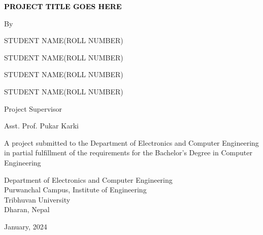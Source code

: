 \begin{titlepage}
    \centering
    
    {\fontsize{12pt}{14pt}\bfseries\textcolor{black}{PROJECT TITLE GOES HERE}\par}
    \vspace{2.0cm}
       {By} \par {STUDENT NAME}({ROLL NUMBER})
            \par {STUDENT NAME}({ROLL NUMBER})
            \par {STUDENT NAME}({ROLL NUMBER})
            \par {STUDENT NAME}({ROLL NUMBER})
       \vspace{2.0cm}\par
    Project Supervisor\par
    Asst. Prof. Pukar Karki\par
    \vspace{2.0cm}
    {A project submitted to the Department of Electronics and Computer Engineering in partial fulfillment of the requirements for the Bachelor’s Degree in Computer Engineering}\par
        \vspace{2.0cm}\par

    {Department of Electronics and Computer Engineering\\ Purwanchal Campus, Institute of Engineering \\ Tribhuvan University\\ Dharan, Nepal}\par
        \vspace{2.0cm}\par
        
   {January, 2024}
   
\end{titlepage}



